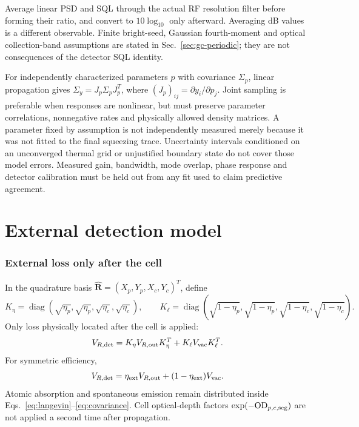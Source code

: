 \documentclass[11pt,a4paper]{article}
\begin{document}
Average linear PSD and SQL through the actual RF resolution filter before
forming their ratio, and convert to $10\log_{10}$ only afterward. Averaging
dB values is a different observable. Finite bright-seed, Gaussian fourth-moment
and optical collection-band assumptions are stated in
Sec.~\ref{sec:gc-periodic}; they are not consequences of the detector SQL
identity.

For independently characterized parameters $p$ with covariance $\Sigma_p$,
linear propagation gives $\Sigma_y=J_p\Sigma_pJ_p^T$, where
$(J_p)_{ij}=\partial y_i/\partial p_j$. Joint sampling is preferable when
responses are nonlinear, but must preserve parameter correlations,
nonnegative rates and physically allowed density matrices. A parameter fixed
by assumption is not independently measured merely because it was not fitted
to the final squeezing trace. Uncertainty intervals conditioned on an
unconverged thermal grid or unjustified boundary state do not cover those
model errors. Measured gain, bandwidth, mode overlap, phase response and
detector calibration must be held out from any fit used to claim predictive
agreement.

\part{External detection model}

\section{External loss only after the cell}

In the quadrature basis
$\hat{\bm R}=(X_p,Y_p,X_c,Y_c)^T$, define
\[
K_\eta=\operatorname{diag}(\sqrt{\eta_p},\sqrt{\eta_p},
\sqrt{\eta_c},\sqrt{\eta_c}),\qquad
K_\ell=\operatorname{diag}(\sqrt{1-\eta_p},\sqrt{1-\eta_p},
\sqrt{1-\eta_c},\sqrt{1-\eta_c}).
\]
Only loss physically located after the cell is applied:
\begin{equation}
V_{R,\rm det}=K_\eta V_{R,\rm out}K_\eta^T
+K_\ell V_{\rm vac}K_\ell^T .
\label{eq:detection-loss}
\end{equation}
For symmetric efficiency,
\[
V_{R,\rm det}=\eta_{\rm ext}V_{R,\rm out}
+(1-\eta_{\rm ext})V_{\rm vac}.
\]
Atomic absorption and spontaneous emission remain distributed inside
Eqs.~\eqref{eq:langevin}--\eqref{eq:covariance}. Cell optical-depth factors
$\exp(-{\rm OD}_{p,c,\rm seg})$ are not applied a second time after
propagation.
\end{document}
